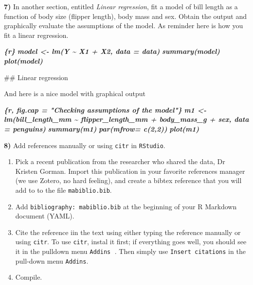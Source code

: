 \documentclass[
  12pt,
]{book}
\newenvironment{Shaded}{\begin{snugshade}}{\end{snugshade}}
\newcommand{\FunctionTok}[1]{\textcolor[rgb]{0.00,0.00,0.00}{#1}}
\newcommand{\InformationTok}[1]{\textcolor[rgb]{0.56,0.35,0.01}{\textbf{\textit{#1}}}}
\newcommand{\NormalTok}[1]{#1}
\providecommand{\tightlist}{%
  \setlength{\itemsep}{0pt}\setlength{\parskip}{0pt}}
\begin{document}
\textbf{7)} In another section, entitled \emph{Linear regression}, fit a model of bill length as a function of body size (flipper length), body mass and sex. Obtain the output and graphically evaluate the assumptions of the model. As reminder here is how you fit a linear regression.

\begin{Shaded}
\begin{Highlighting}[]
\InformationTok{\textasciigrave{}\textasciigrave{}\textasciigrave{}\{r\}}
\InformationTok{model \textless{}{-} lm(Y \textasciitilde{}  X1 + X2, data = data)}
\InformationTok{summary(model)}
\InformationTok{plot(model)}
\InformationTok{\textasciigrave{}\textasciigrave{}\textasciigrave{}}
\end{Highlighting}
\end{Shaded}

\begin{Shaded}
\begin{Highlighting}[]
\FunctionTok{\#\# Linear regression}

\NormalTok{And here is a nice model with graphical output}

\InformationTok{\textasciigrave{}\textasciigrave{}\textasciigrave{}\{r, fig.cap = "Checking assumptions of the model"\}}
\InformationTok{m1 \textless{}{-} lm(bill\_length\_mm \textasciitilde{}  flipper\_length\_mm + body\_mass\_g + sex, data = penguins)}
\InformationTok{summary(m1)}
\InformationTok{par(mfrow= c(2,2))}
\InformationTok{plot(m1)}
\InformationTok{\textasciigrave{}\textasciigrave{}\textasciigrave{}}
\end{Highlighting}
\end{Shaded}

\textbf{8)} Add references manually or using \texttt{citr} in \texttt{RStudio}.

\begin{enumerate}
\def\labelenumi{\arabic{enumi}.}
\tightlist
\item
  Pick a recent publication from the researcher who shared the data, Dr Kristen Gorman. Import this publication in your favorite references manager (we use Zotero, no hard feeling), and create a bibtex reference that you will add to to the file \texttt{mabiblio.bib}.
\item
  Add \texttt{bibliography:\ mabiblio.bib} at the beginning of your R Markdown document (YAML).
\item
  Cite the reference iin the text using either typing the reference manually or using \texttt{citr}. To use \texttt{citr}, instal it first; if everything goes well, you should see it in the pulldown menu \texttt{Addins} 💪. Then simply use \texttt{Insert\ citations} in the pull-down menu \texttt{Addins}.
\item
  Compile.
\end{enumerate}
\end{document}
